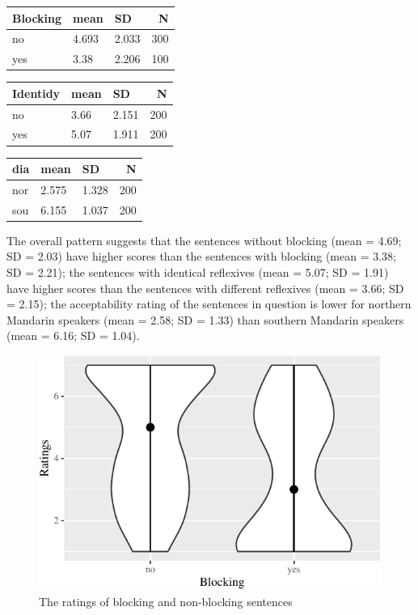 \documentclass[
  english,
  man,floatsintext]{apa6}
\begin{document}
\begin{table}

\centering
\begin{tabular}[t]{l|l|l|r}
\hline
Blocking & mean & SD & N\\
\hline
no & 4.693 & 2.033 & 300\\
\hline
yes & 3.38 & 2.206 & 100\\
\hline
\end{tabular}
\centering
\begin{tabular}[t]{l|l|l|r}
\hline
Identidy & mean & SD & N\\
\hline
no & 3.66 & 2.151 & 200\\
\hline
yes & 5.07 & 1.911 & 200\\
\hline
\end{tabular}
\centering
\begin{tabular}[t]{l|l|l|r}
\hline
dia & mean & SD & N\\
\hline
nor & 2.575 & 1.328 & 200\\
\hline
sou & 6.155 & 1.037 & 200\\
\hline
\end{tabular}
\end{table}

The overall pattern suggests that the sentences without blocking (mean = 4.69; SD = 2.03) have higher scores than the sentences with blocking (mean = 3.38; SD = 2.21); the sentences with identical reflexives (mean = 5.07; SD = 1.91) have higher scores than the sentences with different reflexives (mean = 3.66; SD = 2.15); the acceptability rating of the sentences in question is lower for northern Mandarin speakers (mean = 2.58; SD = 1.33) than southern Mandarin speakers (mean = 6.16; SD = 1.04).

\begin{figure}

{\centering \includegraphics{manuscript_files/figure-latex/plot11-1} 

}

\caption{The ratings of blocking and non-blocking sentences}\label{fig:plot11}
\end{figure}
\end{document}
